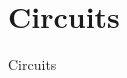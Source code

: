 \documentclass[../book.tex]{subfiles}
\begin{document}
\chapter{Circuits}
\label{ch:circuits}

Circuits





















\chapterbib
\end{document}
